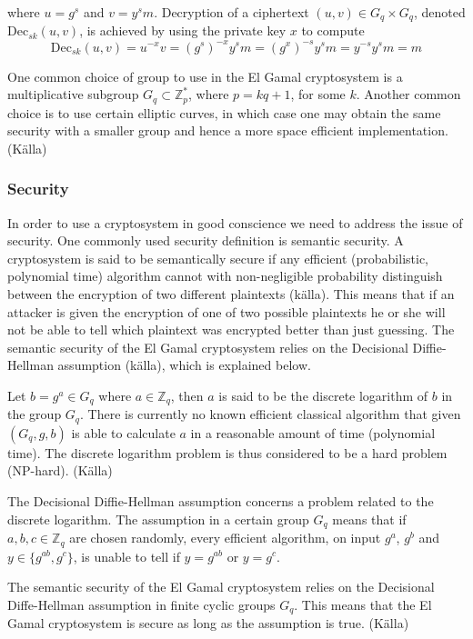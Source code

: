  where $u = g^s$ and $v = y^sm$. Decryption of a ciphertext $(u,v) \in
 G_q \times G_q$, denoted $\mathrm{Dec}_{sk}(u,v)$, is achieved by
 using the private key $x$ to compute
$$
\mathrm{Dec}_{sk}(u,v) = u^{-x}v =
(g^s)^{-x}y^sm = (g^x)^{-s}y^sm = y^{-s}y^sm = m
$$

One common choice of group to use in the El Gamal cryptosystem is a
multiplicative subgroup $G_q \subset \mathbb{Z}_p^*$, where $p = kq +
1$, for some $k$. Another common choice is to use certain elliptic
curves, in which case one may obtain the same security with a smaller
group and hence a more space efficient implementation. (Källa)

\subsubsection{Security}
In order to use a cryptosystem in good conscience we need to address
the issue of security. One commonly used security definition is
semantic security. A cryptosystem is said to be semantically secure if
any efficient (probabilistic, polynomial time) algorithm cannot with
non-negligible probability distinguish between the encryption of two
different plaintexts (källa). This means that if an attacker is given
the encryption of one of two possible plaintexts he or she will not be
able to tell which plaintext was encrypted better than just
guessing. The semantic security of the El Gamal cryptosystem relies on
the Decisional Diffie-Hellman assumption (källa), which is explained
below.

Let $b = g^a \in G_q$ where $a \in \mathbb{Z}_q$, then $a$ is said to
be the discrete logarithm of $b$ in the group $G_q$. There is
currently no known efficient classical algorithm that given $(G_q, g,
b)$ is able to calculate $a$ in a reasonable amount of time
(polynomial time). The discrete logarithm problem is thus considered
to be a hard problem (NP-hard). (Källa)

The Decisional Diffie-Hellman assumption concerns a problem related to
the discrete logarithm. The assumption in a certain group $G_q$ means
that if $a,b,c \in \mathbb{Z}_q$ are chosen randomly, every efficient
algorithm, on input $g^a$, $g^b$ and $y \in \{g^{ab}, g^c\}$, is
unable to tell if $y = g^{ab}$ or $y = g^c$.

The semantic security of the El Gamal cryptosystem relies on the
Decisional Diffe-Hellman assumption in finite cyclic groups
$G_q$. This means that the El Gamal cryptosystem is secure as long as
the assumption is true. (Källa)

